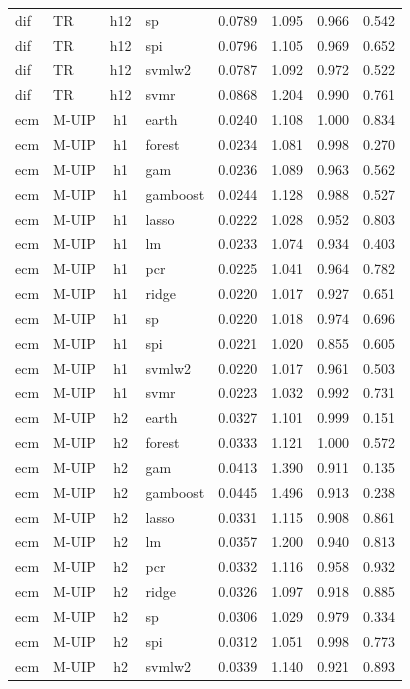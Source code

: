 \begin{ThreePartTable}
\begin{longtable}[t]{llclcccc}
dif & TR & h12 & sp & 0.0789 & 1.095 & 0.966 & 0.542\\
dif & TR & h12 & spi & 0.0796 & 1.105 & 0.969 & 0.652\\
dif & TR & h12 & svmlw2 & 0.0787 & 1.092 & 0.972 & 0.522\\
dif & TR & h12 & svmr & 0.0868 & 1.204 & 0.990 & 0.761\\
\addlinespace
ecm & M-UIP & h1 & earth & 0.0240 & 1.108 & 1.000 & 0.834\\
ecm & M-UIP & h1 & forest & 0.0234 & 1.081 & 0.998 & 0.270\\
ecm & M-UIP & h1 & gam & 0.0236 & 1.089 & 0.963 & 0.562\\
ecm & M-UIP & h1 & gamboost & 0.0244 & 1.128 & 0.988 & 0.527\\
ecm & M-UIP & h1 & lasso & 0.0222 & 1.028 & 0.952 & 0.803\\
ecm & M-UIP & h1 & lm & 0.0233 & 1.074 & 0.934 & 0.403\\
ecm & M-UIP & h1 & pcr & 0.0225 & 1.041 & 0.964 & 0.782\\
ecm & M-UIP & h1 & ridge & 0.0220 & 1.017 & 0.927 & 0.651\\
ecm & M-UIP & h1 & sp & 0.0220 & 1.018 & 0.974 & 0.696\\
ecm & M-UIP & h1 & spi & 0.0221 & 1.020 & 0.855 & 0.605\\
ecm & M-UIP & h1 & svmlw2 & 0.0220 & 1.017 & 0.961 & 0.503\\
ecm & M-UIP & h1 & svmr & 0.0223 & 1.032 & 0.992 & 0.731\\
\addlinespace
ecm & M-UIP & h2 & earth & 0.0327 & 1.101 & 0.999 & 0.151\\
ecm & M-UIP & h2 & forest & 0.0333 & 1.121 & 1.000 & 0.572\\
ecm & M-UIP & h2 & gam & 0.0413 & 1.390 & 0.911 & 0.135\\
ecm & M-UIP & h2 & gamboost & 0.0445 & 1.496 & 0.913 & 0.238\\
ecm & M-UIP & h2 & lasso & 0.0331 & 1.115 & 0.908 & 0.861\\
ecm & M-UIP & h2 & lm & 0.0357 & 1.200 & 0.940 & 0.813\\
ecm & M-UIP & h2 & pcr & 0.0332 & 1.116 & 0.958 & 0.932\\
ecm & M-UIP & h2 & ridge & 0.0326 & 1.097 & 0.918 & 0.885\\
ecm & M-UIP & h2 & sp & 0.0306 & 1.029 & 0.979 & 0.334\\
ecm & M-UIP & h2 & spi & 0.0312 & 1.051 & 0.998 & 0.773\\
ecm & M-UIP & h2 & svmlw2 & 0.0339 & 1.140 & 0.921 & 0.893\\

\end{longtable}
\end{ThreePartTable}
